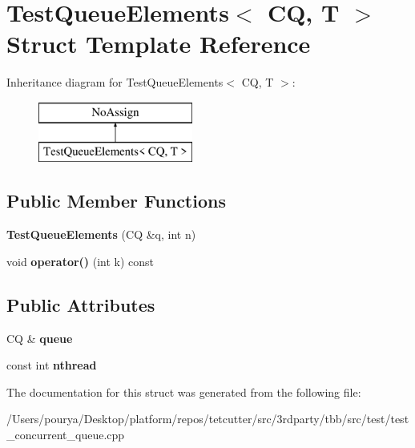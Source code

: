 \hypertarget{structTestQueueElements}{}\section{Test\+Queue\+Elements$<$ C\+Q, T $>$ Struct Template Reference}
\label{structTestQueueElements}
Inheritance diagram for Test\+Queue\+Elements$<$ C\+Q, T $>$\+:\begin{figure}[H]
\begin{center}
\leavevmode
\includegraphics[height=2.000000cm]{structTestQueueElements}
\end{center}
\end{figure}
\subsection*{Public Member Functions}
\begin{DoxyCompactItemize}
\item 
\hypertarget{structTestQueueElements_a47593e23580b47f616321abc2087d25a}{}{\bfseries Test\+Queue\+Elements} (C\+Q \&q, int n)\label{structTestQueueElements_a47593e23580b47f616321abc2087d25a}

\item 
\hypertarget{structTestQueueElements_a38a8fc5deec5a63699a63e036df980c2}{}void {\bfseries operator()} (int k) const \label{structTestQueueElements_a38a8fc5deec5a63699a63e036df980c2}

\end{DoxyCompactItemize}
\subsection*{Public Attributes}
\begin{DoxyCompactItemize}
\item 
\hypertarget{structTestQueueElements_af080c0a9fc8614ba669a722a399470b9}{}C\+Q \& {\bfseries queue}\label{structTestQueueElements_af080c0a9fc8614ba669a722a399470b9}

\item 
\hypertarget{structTestQueueElements_a6ccc1d638c459e17d76898bc7111f483}{}const int {\bfseries nthread}\label{structTestQueueElements_a6ccc1d638c459e17d76898bc7111f483}

\end{DoxyCompactItemize}


The documentation for this struct was generated from the following file\+:\begin{DoxyCompactItemize}
\item 
/\+Users/pourya/\+Desktop/platform/repos/tetcutter/src/3rdparty/tbb/src/test/test\+\_\+concurrent\+\_\+queue.\+cpp\end{DoxyCompactItemize}
